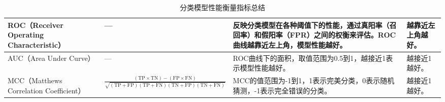 \documentclass[lettersize,journal]{IEEEtran}
\begin{document}
\begin{table*}[h!]
\begin{tabularx}{\textwidth}{|l|X|X|X|}
ROC（Receiver Operating Characteristic） & 
--- & 
反映分类模型在各种阈值下的性能，通过真阳率（召回率）和假阳率（FPR）之间的权衡来评估。ROC曲线越靠近左上角，模型性能越好。 & 越靠近左上角越好。 \\ \hline

AUC（Area Under Curve） & 
--- & 
ROC曲线下的面积，取值范围为0.5到1，越接近1表示模型性能越好。 & 越接近1越好。 \\ \hline

MCC（Matthews Correlation Coefficient） & 
$\frac{(\text{TP} \times \text{TN}) - (\text{FP} \times \text{FN})}{\sqrt{(\text{TP} + \text{FP})(\text{TP} + \text{FN})(\text{TN} + \text{FP})(\text{TN} + \text{FN})}}$ & 
MCC的值范围为-1到1，1表示完美分类，0表示随机猜测，-1表示完全错误的分类。 & 越接近1越好。 \\ \hline

\end{tabularx}
\caption{分类模型性能衡量指标总结}
\end{table*}

\end{document}
